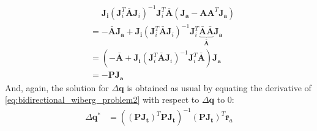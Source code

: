 \begin{equation}
\begin{aligned}
        & \quad \, \, \mathbf{J}_{\mathbf{i}} \left( \mathbf{J}_i^T \bar{\mathbf{A}} \mathbf{J}_i \right)^{-1} \mathbf{J}_i^T \bar{\mathbf{A}} (\mathbf{J}_{\mathbf{a}} - \mathbf{A} \mathbf{A}^T \mathbf{J}_{\mathbf{a}})
        \\
        & = - \bar{\mathbf{A}} \mathbf{J}_{\mathbf{a}} + \mathbf{J}_{\mathbf{i}} \left( \mathbf{J}_i^T \bar{\mathbf{A}} \mathbf{J}_i \right)^{-1} \mathbf{J}_i^T \underbrace{\bar{\mathbf{A}} \bar{\mathbf{A}}}_{\bar{\mathbf{A}}} \mathbf{J}_{\mathbf{a}}
        \\
        & = \left( -\bar{\mathbf{A}} + \mathbf{J}_{\mathbf{i}} \left( \mathbf{J}_i^T \bar{\mathbf{A}} \mathbf{J}_i \right)^{-1} \mathbf{J}_i^T \bar{\mathbf{A}} \right) \mathbf{J}_{\mathbf{a}}
        \\
        & = - \mathbf{P} \mathbf{J}_{\mathbf{a}}
    \label{eq:bidirectional_wiberg_jacobian}
    \end{aligned}
\end{equation}
 And, again, the solution for $\Delta\mathbf{q}$ is obtained as usual by equating the derivative of \ref{eq:bidirectional_wiberg_problem2} with respect to $\Delta\mathbf{q}$ to 0:
 \begin{equation}
    \begin{aligned}
    	\Delta \mathbf{q}^* & = \left( \left( \mathbf{P} \mathbf{J}_{\mathbf{t}} \right)^T \mathbf{P} \mathbf{J}_{\mathbf{t}} \right)^{-1} \left( \mathbf{P} \mathbf{J}_{\mathbf{t}} \right)^T \bar{\mathbf{r}}_a
    \label{eq:bidirectional_wiberg_solution}
    \end{aligned}
\end{equation}

